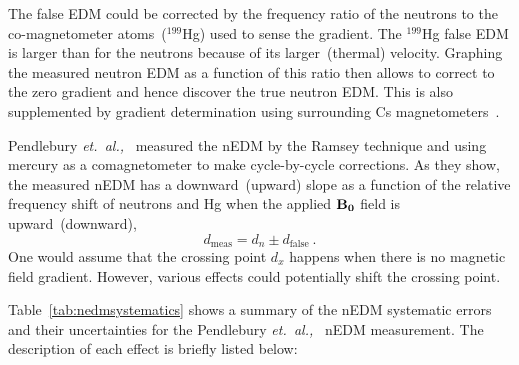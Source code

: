 The false EDM could be corrected by the frequency ratio of the
neutrons to the co-magnetometer atoms~($^{199}$Hg) used to sense the
gradient. The $^{199}$Hg false EDM is larger than for the neutrons
because of its larger~(thermal) velocity.  Graphing the measured
neutron EDM as a function of this ratio then allows to correct to the
zero gradient and hence discover the true neutron EDM. This is also
supplemented by gradient determination using surrounding Cs
magnetometers~\cite{afach2015measurement}.


Pendlebury {\it{et.~al.,}}~\cite{Pendlebury2015} measured the nEDM by
the Ramsey technique and using mercury as a comagnetometer to make
cycle-by-cycle corrections.  As they show, the measured nEDM has a
downward~(upward) slope as a function of the relative frequency shift
of neutrons and Hg when the applied $\bf{B_0}$ field is
upward~(downward),
\begin{equation}
  d_{\mathrm {meas}}= d_n \pm d_{\mathrm{false}}~.
\end{equation}
One would assume that the crossing point $d_x$ happens when there is
no magnetic field gradient. However, various effects could potentially
shift the crossing point.


Table~\ref{tab:nedmsystematics} shows a summary of the nEDM systematic
errors and their uncertainties for the Pendlebury
{\it{et.~al.,}}~\cite{Pendlebury2015} nEDM measurement. The
description of each effect is briefly listed below:

